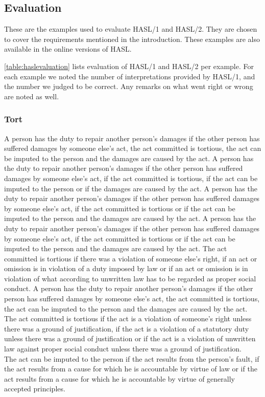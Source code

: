 \subsection{Evaluation}
\label{sec:appevaluation}
These are the examples used to evaluate HASL/1 and HASL/2. They are chosen to cover the requirements mentioned in the introduction. These examples are also available in the online versions of HASL.

\autoref{table:haslevaluation} lists evaluation of HASL/1 and HASL/2 per example. For each example we noted the number of interpretations provided by HASL/1, and the number we judged to be correct. Any remarks on what went right or wrong are noted as well.

\subsubsection{Tort}
\begin{exe}
\ex\label{e126} A person has the duty to repair another person's damages if the other person has suffered damages by someone else's act, the act committed is tortious, the act can be imputed to the person and the damages are caused by the act.
\ex\label{e127} A person has the duty to repair another person's damages if the other person has suffered damages by someone else's act, if the act committed is tortious, if the act can be imputed to the person or if the damages are caused by the act.
\ex\label{e128} A person has the duty to repair another person's damages if the other person has suffered damages by someone else's act, if the act committed is tortious or if the act can be imputed to the person and the damages are caused by the act.
\ex\label{e129} A person has the duty to repair another person's damages if the other person has suffered damages by someone else's act, if the act committed is tortious or if the act can be imputed to the person and the damages are caused by the act. The act committed is tortious if there was a violation of someone else’s right, if an act or omission is in violation of a duty imposed by law or if an act or omission is in violation of what according to unwritten law has to be regarded as proper social conduct.
\ex\label{e130} A person has the duty to repair another person's damages if the other person has suffered damages by someone else's act, the act committed is tortious, the act can be imputed to the person and the damages are caused by the act.\\ The act committed is tortious if the act is a violation of someone’s right unless there was a ground of justification, if the act is a violation of a statutory duty unless there was a ground of justification or if the act is a violation of unwritten law against proper social conduct unless there was a ground of justification.\\ The act can be imputed to the person if the act results from the person's fault, if the act results from a cause for which he is accountable by virtue of law or if the act results from a cause for which he is accountable by virtue of generally accepted principles.
\end{exe}

\clearpage